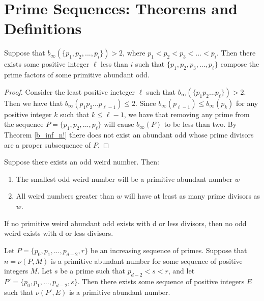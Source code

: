 \documentclass[../paper.tex]{subfiles}
\begin{document}
\section{Prime Sequences: Theorems and Definitions}

\begin{theorem} \label{Primechops}
Suppose that $b_{\infty}(\{p_1,p_2, ..., p_i\}) > 2$,
where $p_1 < p_2 < p_3 < ... < p_i$. Then there exists some
positive integer $\ell$ less than $i$ such that $\{p_1, p_2, p_3, 
..., p_\ell\}$ compose the prime factors of some primitive 
abundant odd.
\end{theorem}

\begin{proof}
	Consider the least positive ineteger $\ell$ such that $b_{\infty}(\{
p_1 p_2 ... p_\ell\}) > 2$. Then we have that $b_{\infty}(p_1 p_2 
... p_{\ell - 1}) \leq 2$. Since 
$b_{\infty}(p_{\ell - 1}) \leq b_{\infty}(p_{k})$ for any
positive integer $k$ such that  $k \leq \ell - 1$, we have that
removing any prime from the sequence $P = \{p_1, p_2, ..., p_{\ell} \}$ will
cause $b_{\infty}(P)$ to be less than two. By Theorem
{\ref{b_inf_n!}} there does not exist
an abundant odd whose prime divisors are a proper subsequence of
$P$.
\end{proof}

\begin{theorem} Suppose there exists an odd weird number. Then:

\begin{enumerate}
  \item The smallest odd weird number will be a primitive abundant
number $w$
  \item All weird numbers greater than $w$ will have at least as
many prime divisors as $w$.
\end{enumerate} 
\end{theorem}

\begin{coro} If no primitive weird abundant odd exists
with d or less divisors, then no odd weird exists with d or less
divisors.
\end{coro}


\begin{theorem}\label{Continuity}
Let $P = \{p_0, p_1, ..., p_{d-2}, r\}$ be an increasing sequence 
of primes. Suppose that $n = \nu(P, M)$ is a primitive abundant 
number for some sequence of positive integers $M$. Let $s$ be a 
prime such that $p_{d-2} < s < r$, and let $P' = \{p_0, p_1,...,
p_{d-2}, s\}$. Then there exists some sequence of positive integers
$E$ such that $\nu(P', E)$ is a primitive abundant number.
\end{theorem}
\end{document}
